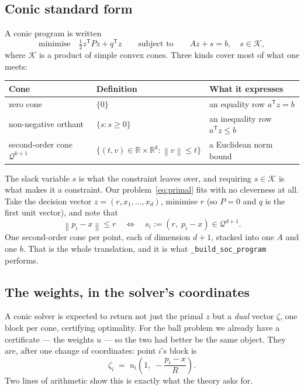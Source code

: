 \documentclass[11pt,a4paper]{article}
\theoremstyle{plain}
\theoremstyle{definition}
\theoremstyle{remark}
\newcommand{\R}{\mathbb{R}}
\newcommand{\norm}[1]{\left\lVert #1 \right\rVert}
\newcommand{\transpose}{^{\mathsf{T}}}
\begin{document}
\subsection{Conic standard form}
\label{sec:conic}

A conic program is written
\begin{equation}
  \label{eq:conic}
  \text{minimise}\quad \tfrac12 z\transpose P z + q\transpose z
  \qquad\text{subject to}\qquad
  A z + s = b, \quad s \in \mathcal{K},
\end{equation}
where $\mathcal{K}$ is a product of simple convex cones. Three kinds cover most
of what one meets:
\begin{center}
\begin{tabular}{lll}
  \toprule
  \textbf{Cone} & \textbf{Definition} & \textbf{What it expresses} \\
  \midrule
  zero cone            & $\{0\}$ & an equality row $a\transpose z = b$ \\
  non-negative orthant & $\{s : s\ge 0\}$ & an inequality row $a\transpose z \le b$ \\
  second-order cone $\mathcal{Q}^{k+1}$ & $\{(t,v)\in\R\times\R^k : \norm{v}\le t\}$
    & a Euclidean norm bound \\
  \bottomrule
\end{tabular}
\end{center}

The slack variable $s$ is what the constraint leaves over, and requiring
$s\in\mathcal{K}$ is what makes it a constraint. Our
problem~\eqref{eq:primal} fits with no cleverness at all. Take the decision
vector $z=(r,x_1,\dots,x_d)$, minimise $r$ (so $P=0$ and $q$ is the first unit
vector), and note that
\[
  \norm{p_i - x} \le r
  \quad\Longleftrightarrow\quad
  s_i := (r,\; p_i - x) \in \mathcal{Q}^{d+1} .
\]
One second-order cone per point, each of dimension $d+1$, stacked into one $A$
and one $b$. That is the whole translation, and it is what
\texttt{\_build\_soc\_program} performs.

\subsection{The weights, in the solver's coordinates}

A conic solver is expected to return not just the primal $z$ but a \emph{dual}
vector $\zeta$, one block per cone, certifying optimality. For the ball problem
we already have a certificate --- the weights $u$ --- so the two had better be
the same object. They are, after one change of coordinates: point $i$'s block is
\begin{equation}
  \label{eq:conic-dual}
  \zeta_i \;=\; u_i \left(1,\; -\frac{p_i - x}{R}\right) .
\end{equation}
Two lines of arithmetic show this is exactly what the theory asks for.
\end{document}
